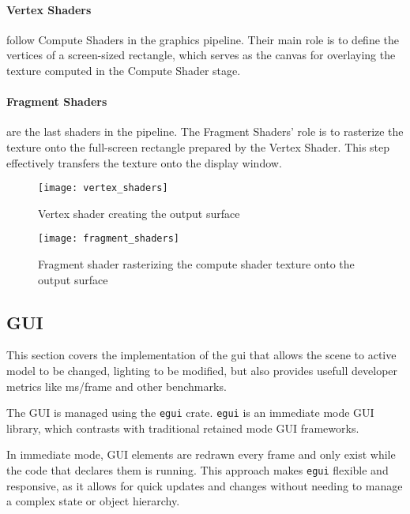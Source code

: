 \paragraph{Vertex Shaders} follow Compute Shaders in the graphics pipeline. Their main role is to define the vertices of a screen-sized rectangle, which serves as the canvas for overlaying the texture computed in the Compute Shader stage.
\paragraph{Fragment Shaders} are the last shaders in the pipeline. The Fragment Shaders' role is to rasterize the texture onto the full-screen rectangle prepared by the Vertex Shader. This step effectively transfers the texture onto the display window.
\begin{multicols}{2}
  \begin{figure}[H]
    \centering
    \texttt{[image: vertex\_shaders]}
    \caption{Vertex shader creating the output surface}
  \end{figure}

  \begin{figure}[H]
    \centering
    \texttt{[image: fragment\_shaders]}
    \caption{Fragment shader rasterizing the compute shader texture onto the output surface}
  \end{figure}
\end{multicols}

\subsection{GUI}

This section covers the implementation of the \acrshort{gui} that allows the scene to active model to be changed, lighting to be modified, but also provides usefull developer metrics like ms/frame and other benchmarks.

The GUI is managed using the \verb|egui| crate\supercite{egui:doc}.
\verb|egui| is an immediate\supercite{im_gui} mode GUI library, which contrasts with traditional retained mode GUI frameworks\supercite{im_vs_rt}.

In immediate mode, GUI elements are redrawn every frame and only exist while the code that declares them is running. This approach makes \verb|egui| flexible and responsive, as it allows for quick updates and changes without needing to manage a complex state or object hierarchy.


